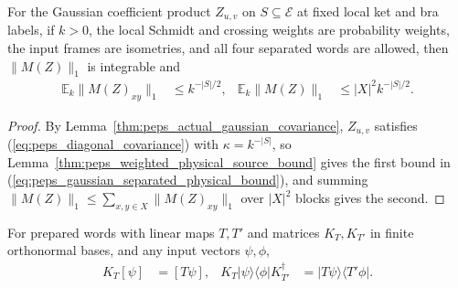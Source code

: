 \begin{lemma}
    \label{thm:peps_gaussian_separated_physical_bound}
    \leanok
    For the Gaussian coefficient product $Z_{u,v}$ on $S\subseteq\mathcal E$ at
    fixed local ket and bra labels, if $k>0$, the local Schmidt and crossing
    weights are probability weights, the input frames are isometries, and all
    four separated words are allowed, then $\|M(Z)\|_1$ is integrable and
    \begin{align}
        \mathbb E_k\|M(Z)_{xy}\|_1 & \leq k^{-|S|/2},       &
        \mathbb E_k\|M(Z)\|_1      & \leq |X|^2 k^{-|S|/2}.
        \label{eq:peps_gaussian_separated_physical_bound}
    \end{align}
\end{lemma}

\begin{proof}\leanok
    By Lemma~\ref{thm:peps_actual_gaussian_covariance}, $Z_{u,v}$ satisfies
    (\ref{eq:peps_diagonal_covariance}) with $\kappa=k^{-|S|}$, so
    Lemma~\ref{thm:peps_weighted_physical_source_bound} gives the first bound
    in (\ref{eq:peps_gaussian_separated_physical_bound}), and summing
    $\|M(Z)\|_1\le\sum_{x,y\in X}\|M(Z)_{xy}\|_1$ over $|X|^2$ blocks gives the
    second.
\end{proof}

\begin{lemma}
    \label{thm:peps_prepared_vector_density}
    \leanok
    For prepared words with linear maps $T,T'$ and matrices $K_T,K_{T'}$ in
    finite orthonormal bases, and any input vectors $\psi,\phi$,
    \begin{align}
        K_T[\psi] & =[T\psi],                      &
        K_T|\psi\rangle\langle\phi|K_{T'}^\dagger
                  & =|T\psi\rangle\langle T'\phi|.
        \label{eq:peps_prepared_vector_density}
    \end{align}
\end{lemma}

